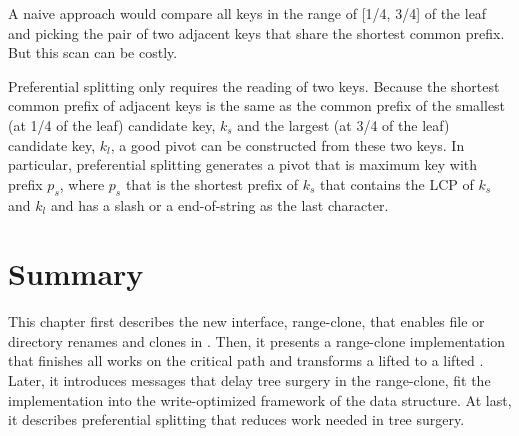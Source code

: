 A naive approach would compare all keys in the range of [1/4, 3/4] of the leaf
and picking the pair of two adjacent keys that share the shortest common prefix.
But this scan can be costly.

Preferential splitting only requires the reading of two keys.
Because the shortest common prefix of adjacent keys is the same as the common
prefix of the smallest (at 1/4 of the leaf) candidate key, $k_{s}$ and
the largest (at 3/4 of the leaf) candidate key, $k_{l}$,
a good pivot can be constructed from these two keys.
In particular, preferential splitting generates a pivot that is maximum key with
prefix $p_{s}$, where $p_{s}$ that is the shortest prefix of $k_{s}$ that
contains the LCP of $k_{s}$ and $k_{l}$ and has a slash or a end-of-string as
the last character.

\section{Summary}

This chapter first describes the new interface, range-clone, that enables file
or directory renames and clones in \betrfs.
Then, it presents a range-clone implementation that finishes all works
on the critical path and transforms a lifted \bet to a lifted \bedag.
Later, it introduces \goto messages that delay tree surgery in the range-clone,
fit the implementation into the write-optimized framework of the data structure.
At last, it describes preferential splitting that reduces work needed in
tree surgery.
